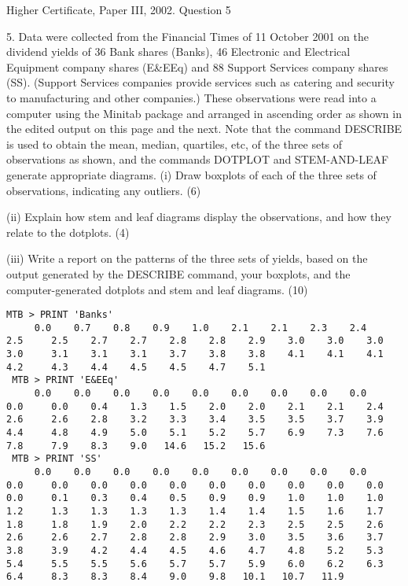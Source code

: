 \documentclass[a4paper,12pt]{article}
\begin{document}
Higher Certificate, Paper III, 2002. Question 5

\begin{framed}
5. Data were collected from the Financial Times of 11 October 2001 on the dividend yields of 36 Bank shares (Banks), 46 Electronic and Electrical Equipment company shares (E&EEq) and 88 Support Services company shares (SS).  (Support Services companies provide services such as catering and security to manufacturing and other companies.)  These observations were read into a computer using the Minitab package and arranged in ascending order as shown in the edited output on this page and the next. 
 Note that the command DESCRIBE is used to obtain the mean, median, quartiles, etc, of the three sets of observations as shown, and the commands DOTPLOT and STEM-AND-LEAF generate appropriate diagrams. 
 (i) Draw boxplots of each of the three sets of observations, indicating any outliers.         (6) 
 
(ii) Explain how stem and leaf diagrams display the observations, and how they relate to the dotplots.       (4) 
 
(iii) Write a report on the patterns of the three sets of yields, based on the output generated by the DESCRIBE command, your boxplots, and the computer-generated dotplots and stem and leaf diagrams.            (10) 
 

\begin{verbatim} 
MTB > PRINT 'Banks' 
     0.0    0.7    0.8    0.9    1.0    2.1    2.1    2.3    2.4    2.5     2.5    2.7    2.7    2.8    2.8    2.9    3.0    3.0    3.0    3.0     3.1    3.1    3.1    3.7    3.8    3.8    4.1    4.1    4.1    4.2     4.3    4.4    4.5    4.5    4.7    5.1 
 MTB > PRINT 'E&EEq' 
     0.0    0.0    0.0    0.0    0.0    0.0    0.0    0.0    0.0    0.0     0.0    0.4    1.3    1.5    2.0    2.0    2.1    2.1    2.4    2.6     2.6    2.8    3.2    3.3    3.4    3.5    3.5    3.7    3.9    4.4     4.8    4.9    5.0    5.1    5.2    5.7    6.9    7.3    7.6    7.8     7.9    8.3    9.0   14.6   15.2   15.6 
 MTB > PRINT 'SS' 
     0.0    0.0    0.0    0.0    0.0    0.0    0.0    0.0    0.0    0.0     0.0    0.0    0.0    0.0    0.0    0.0    0.0    0.0    0.0    0.0     0.1    0.3    0.4    0.5    0.9    0.9    1.0    1.0    1.0    1.2     1.3    1.3    1.3    1.3    1.4    1.4    1.5    1.6    1.7    1.8     1.8    1.9    2.0    2.2    2.2    2.3    2.5    2.5    2.6    2.6     2.6    2.7    2.8    2.8    2.9    3.0    3.5    3.6    3.7    3.8     3.9    4.2    4.4    4.5    4.6    4.7    4.8    5.2    5.3    5.4     5.5    5.5    5.6    5.7    5.7    5.9    6.0    6.2    6.3    6.4     8.3    8.3    8.4    9.0    9.8   10.1   10.7   11.9 
\end{verbatim} 
 


\end{framed}
\end{document}
